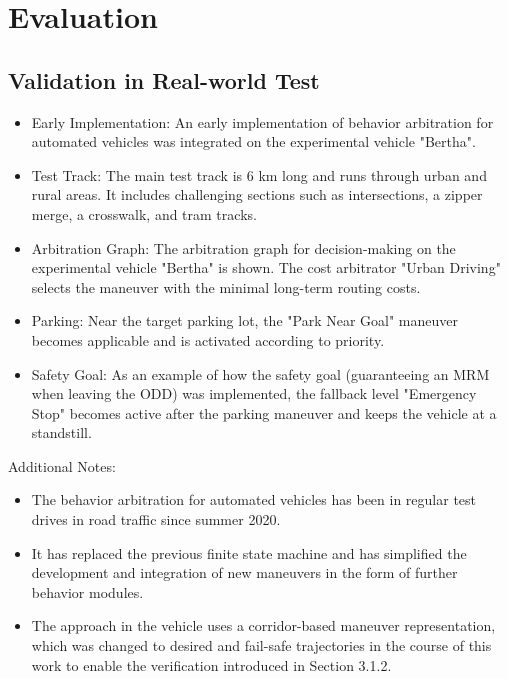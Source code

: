 \section{Evaluation}

\subsection{Validation in Real-world Test}

\begin{itemize}
    \item Early Implementation: An early implementation of behavior arbitration for automated vehicles was integrated on the experimental vehicle "Bertha".
    \item Test Track: The main test track is 6 km long and runs through urban and rural areas. It includes challenging sections such as intersections, a zipper merge, a crosswalk, and tram tracks.
    \item Arbitration Graph: The arbitration graph for decision-making on the experimental vehicle "Bertha" is shown. The cost arbitrator "Urban Driving" selects the maneuver with the minimal long-term routing costs.
    \item Parking: Near the target parking lot, the "Park Near Goal" maneuver becomes applicable and is activated according to priority.
    \item Safety Goal: As an example of how the safety goal (guaranteeing an MRM when leaving the ODD) was implemented, the fallback level "Emergency Stop" becomes active after the parking maneuver and keeps the vehicle at a standstill.
\end{itemize}

Additional Notes:

\begin{itemize}
    \item The behavior arbitration for automated vehicles has been in regular test drives in road traffic since summer 2020.
    \item It has replaced the previous finite state machine and has simplified the development and integration of new maneuvers in the form of further behavior modules.
    \item The approach in the vehicle uses a corridor-based maneuver representation, which was changed to desired and fail-safe trajectories in the course of this work to enable the verification introduced in Section 3.1.2.
\end{itemize}

